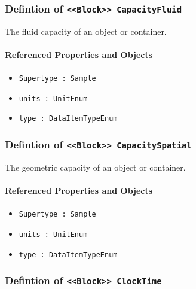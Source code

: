 \subsubsection{Defintion of \texttt{<<Block>> CapacityFluid}}
  \label{type:CapacityFluid}

\FloatBarrier

The fluid capacity of an object or container.

\FloatBarrier
\paragraph{Referenced Properties and Objects}

\begin{itemize}
\item \texttt{Supertype : Sample}

\item \texttt{units : UnitEnum}

\item \texttt{type : DataItemTypeEnum}

\end{itemize}
\FloatBarrier
\subsubsection{Defintion of \texttt{<<Block>> CapacitySpatial}}
  \label{type:CapacitySpatial}

\FloatBarrier

The geometric capacity of an object or container.

\FloatBarrier
\paragraph{Referenced Properties and Objects}

\begin{itemize}
\item \texttt{Supertype : Sample}

\item \texttt{units : UnitEnum}

\item \texttt{type : DataItemTypeEnum}

\end{itemize}
\FloatBarrier
\subsubsection{Defintion of \texttt{<<Block>> ClockTime}}
  \label{type:ClockTime}

